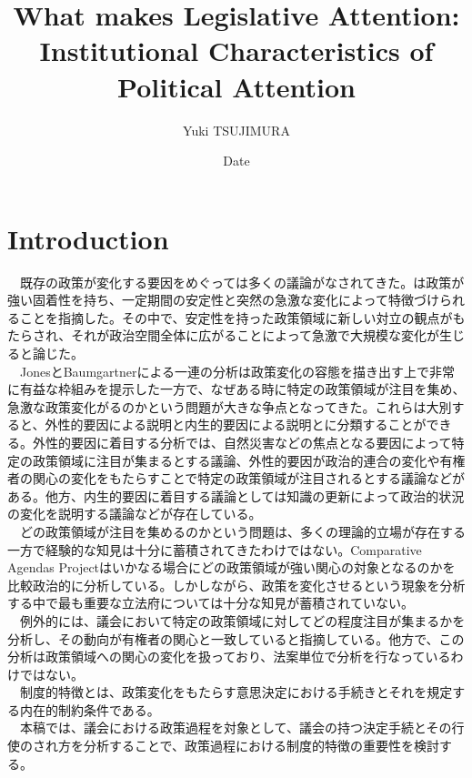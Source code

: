 \documentclass{article}
\title{What makes Legislative Attention: Institutional Characteristics of Political Attention}
\author{Yuki TSUJIMURA}
\date{Date}
\begin{document}
\maketitle

\section*{Introduction}
　既存の政策が変化する要因をめぐっては多くの議論がなされてきた。\citet*{Baumgartner2010-rl}は政策が強い固着性を持ち、一定期間の安定性と突然の急激な変化によって特徴づけられることを指摘した。その中で、安定性を持った政策領域に新しい対立の観点がもたらされ、それが政治空間全体に広がることによって急激で大規模な変化が生じると論じた。\citep*{Baumgartner2010-rl}\\
　JonesとBaumgartnerによる一連の分析\citep*{Baumgartner2010-rl, Baumgartner2009-eb,Baumgartner2020-ee}は政策変化の容態を描き出す上で非常に有益な枠組みを提示した一方で、なぜある時に特定の政策領域が注目を集め、急激な政策変化がるのかという問題が大きな争点となってきた。これらは大別すると、外性的要因による説明と内生的要因による説明とに分類することができる。外性的要因に着目する分析では、自然災害などの焦点となる要因によって特定の政策領域に注目が集まるとする議論\citep*{Birkland1997-lq,Birkland1998-xp}、外性的要因が政治的連合の変化\citep*{Sabatier1993-id}や有権者の関心の変化\citep*{Bertelli2013-zq}をもたらすことで特定の政策領域が注目されるとする議論などがある。他方、内生的要因に着目する議論としては知識の更新によって政治的状況の変化を説明する議論\citep*{Baumgartner2010-rl}などが存在している。\\
　どの政策領域が注目を集めるのかという問題は、多くの理論的立場が存在する一方で経験的な知見は十分に蓄積されてきたわけではない。Comparative Agendas Projectはいかなる場合にどの政策領域が強い関心の対象となるのかを比較政治的に分析している。しかしながら、政策を変化させるという現象を分析する中で最も重要な立法府については十分な知見が蓄積されていない。\\
　例外的に\citet*{Jones2004-ou}は、議会において特定の政策領域に対してどの程度注目が集まるかを分析し、その動向が有権者の関心と一致していると指摘している。他方で、この分析は政策領域への関心の変化を扱っており、法案単位で分析を行なっているわけではない。\\
　制度的特徴とは、政策変化をもたらす意思決定における手続きとそれを規定する内在的制約条件である。\\
　本稿では、議会における政策過程を対象として、議会の持つ決定手続とその行使のされ方を分析することで、政策過程における制度的特徴の重要性を検討する。\\
\end{document}
